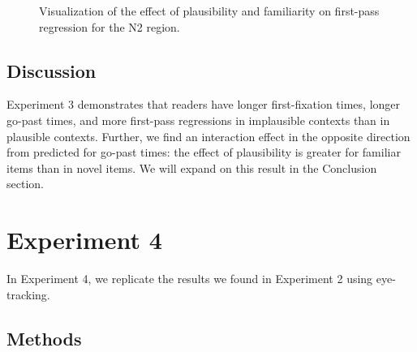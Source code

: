 \documentclass[
  12pt,
  letterpaper,
]{scrreprt}
\begin{document}
\begin{figure}[htbp]

\caption{\label{fig-firstpassn2staub}Visualization of the effect of
plausibility and familiarity on first-pass regression for the N2
region.}


\end{figure}%

\subsection{Discussion}\label{discussion-2}

Experiment 3 demonstrates that readers have longer first-fixation times,
longer go-past times, and more first-pass regressions in implausible
contexts than in plausible contexts. Further, we find an interaction
effect in the opposite direction from predicted for go-past times: the
effect of plausibility is greater for familiar items than in novel
items. We will expand on this result in the Conclusion section.

\section{Experiment 4}\label{experiment-4}

In Experiment 4, we replicate the results we found in Experiment 2 using
eye-tracking.

\subsection{Methods}\label{methods-3}
\end{document}
